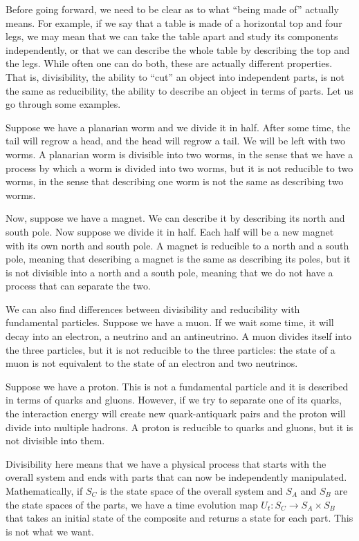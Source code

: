Before going forward, we need to be clear as to what ``being made of'' actually means. For example, if we say that a table is made of a horizontal top and four legs, we may mean that we can take the table apart and study its components independently, or that we can describe the whole table by describing the top and the legs. While often one can do both, these are actually different properties. That is, divisibility, the ability to ``cut'' an object into independent parts, is not the same as reducibility, the ability to describe an object in terms of parts. Let us go through some examples.

Suppose we have a planarian worm and we divide it in half. After some time, the tail will regrow a head, and the head will regrow a tail. We will be left with two worms. A planarian worm is divisible into two worms, in the sense that we have a process by which a worm is divided into two worms, but it is not reducible to two worms, in the sense that describing one worm is not the same as describing two worms.

Now, suppose we have a magnet. We can describe it by describing its north and south pole. Now suppose we divide it in half. Each half will be a new magnet with its own north and south pole. A magnet is reducible to a north and a south pole, meaning that describing a magnet is the same as describing its poles, but it is not divisible into a north and a south pole, meaning that we do not have a process that can separate the two.

We can also find differences between divisibility and reducibility with fundamental particles. Suppose we have a muon. If we wait some time, it will decay into an electron, a neutrino and an antineutrino. A muon divides itself into the three particles, but it is not reducible to the three particles: the state of a muon is not equivalent to the state of an electron and two neutrinos.

Suppose we have a proton. This is not a fundamental particle and it is described in terms of quarks and gluons. However, if we try to separate one of its quarks, the interaction energy will create new quark-antiquark pairs and the proton will divide into multiple hadrons. A proton is reducible to quarks and gluons, but it is not divisible into them.

Divisibility here means that we have a physical process that starts with the overall system and ends with parts that can now be independently manipulated. Mathematically, if $S_C$ is the state space of the overall system and $S_A$ and $S_B$ are the state spaces of the parts, we have a time evolution map $U_t : S_C \to S_A \times S_B$ that takes an initial state of the composite and returns a state for each part. This is not what we want.

